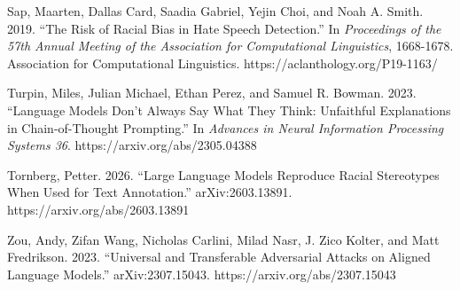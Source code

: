 \documentclass[
  letterpaper,
  11pt]{article}
\begin{document}
Sap, Maarten, Dallas Card, Saadia Gabriel, Yejin Choi, and Noah A.
Smith. 2019. ``The Risk of Racial Bias in Hate Speech Detection.'' In
\emph{Proceedings of the 57th Annual Meeting of the Association for
Computational Linguistics}, 1668-1678. Association for Computational
Linguistics. https://aclanthology.org/P19-1163/

Turpin, Miles, Julian Michael, Ethan Perez, and Samuel R. Bowman. 2023.
``Language Models Don't Always Say What They Think: Unfaithful
Explanations in Chain-of-Thought Prompting.'' In \emph{Advances in
Neural Information Processing Systems 36}.
https://arxiv.org/abs/2305.04388

Tornberg, Petter. 2026. ``Large Language Models Reproduce Racial
Stereotypes When Used for Text Annotation.'' arXiv:2603.13891.
https://arxiv.org/abs/2603.13891

Zou, Andy, Zifan Wang, Nicholas Carlini, Milad Nasr, J. Zico Kolter, and
Matt Fredrikson. 2023. ``Universal and Transferable Adversarial Attacks
on Aligned Language Models.'' arXiv:2307.15043.
https://arxiv.org/abs/2307.15043
\end{document}
